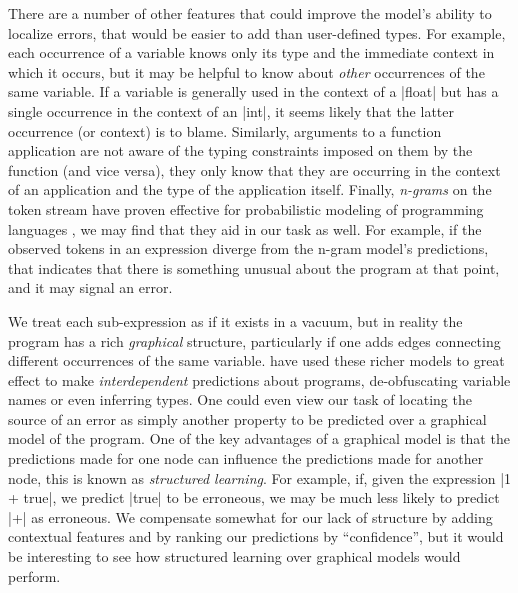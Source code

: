 There are a number of other features that could improve the model's
ability to localize errors, that would be easier to add than
user-defined types.
%
For example, each occurrence of a variable knows only its type and the
immediate context in which it occurs, but it may be helpful to know
about \emph{other} occurrences of the same variable.
%
If a variable is generally used in the context of a |float| but has a
single occurrence in the context of an |int|, it seems likely that the
latter occurrence (or context) is to blame.
%
Similarly, arguments to a function application are not aware of the
typing constraints imposed on them by the function (and vice versa),
they only know that they are occurring in the context of an application
and the type of the application itself.
%
Finally, \emph{n-grams} on the token stream have proven effective for
probabilistic modeling of programming languages
\citep{Hindle2012-hf,Gabel2010-el}, we may find that they aid in
our task as well.
%
For example, if the observed tokens in an expression diverge from the
n-gram model's predictions, that indicates that there is something
unusual about the program at that point, and it may signal an error.


We treat each sub-expression as if it exists in a vacuum, but in reality
the program has a rich \emph{graphical} structure, particularly if one adds
edges connecting different occurrences of the same variable.
%
\citet{Raychev2015-jg} have used these richer models to great effect to
make \emph{interdependent} predictions about programs, \eg
de-obfuscating variable names or even inferring types.
%
One could even view our task of locating the source of an error as simply
another property to be predicted over a graphical model of the program.
%
One of the key advantages of a graphical model is that the predictions
made for one node can influence the predictions made for another node,
this is known as \emph{structured learning}.
%
For example, if, given the expression |1 + true|, we predict |true| to
be erroneous, we may be much less likely to predict |+| as erroneous.
%
We compensate somewhat for our lack of structure by adding contextual
features and by ranking our predictions by ``confidence'', but it would
be interesting to see how structured learning over graphical models
would perform.


